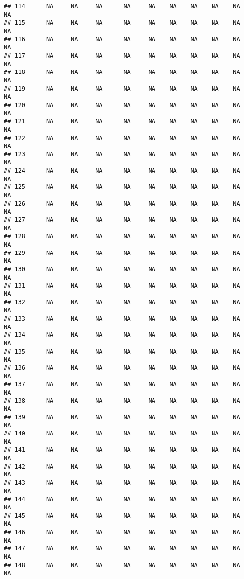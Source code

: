 \documentclass{article}\usepackage{graphicx, color}
\makeatletter
\newenvironment{kframe}{%
 \def\at@end@of@kframe{}%
 \ifinner\ifhmode%
  \def\at@end@of@kframe{\end{minipage}}%
  \begin{minipage}{\columnwidth}%
 \fi\fi%
 \def\FrameCommand##1{\hskip\@totalleftmargin \hskip-\fboxsep
 \colorbox{shadecolor}{##1}\hskip-\fboxsep
     \hskip-\linewidth \hskip-\@totalleftmargin \hskip\columnwidth}%
 \MakeFramed {\advance\hsize-\width
   \@totalleftmargin\z@ \linewidth\hsize
   \@setminipage}}%
 {\par\unskip\endMakeFramed%
 \at@end@of@kframe}
\newenvironment{knitrout}{}{} %
\makeatother
\begin{document}
\begin{knitrout}
\begin{kframe}
\begin{verbatim}
## 114      NA     NA     NA      NA     NA    NA    NA    NA    NA     NA
## 115      NA     NA     NA      NA     NA    NA    NA    NA    NA     NA
## 116      NA     NA     NA      NA     NA    NA    NA    NA    NA     NA
## 117      NA     NA     NA      NA     NA    NA    NA    NA    NA     NA
## 118      NA     NA     NA      NA     NA    NA    NA    NA    NA     NA
## 119      NA     NA     NA      NA     NA    NA    NA    NA    NA     NA
## 120      NA     NA     NA      NA     NA    NA    NA    NA    NA     NA
## 121      NA     NA     NA      NA     NA    NA    NA    NA    NA     NA
## 122      NA     NA     NA      NA     NA    NA    NA    NA    NA     NA
## 123      NA     NA     NA      NA     NA    NA    NA    NA    NA     NA
## 124      NA     NA     NA      NA     NA    NA    NA    NA    NA     NA
## 125      NA     NA     NA      NA     NA    NA    NA    NA    NA     NA
## 126      NA     NA     NA      NA     NA    NA    NA    NA    NA     NA
## 127      NA     NA     NA      NA     NA    NA    NA    NA    NA     NA
## 128      NA     NA     NA      NA     NA    NA    NA    NA    NA     NA
## 129      NA     NA     NA      NA     NA    NA    NA    NA    NA     NA
## 130      NA     NA     NA      NA     NA    NA    NA    NA    NA     NA
## 131      NA     NA     NA      NA     NA    NA    NA    NA    NA     NA
## 132      NA     NA     NA      NA     NA    NA    NA    NA    NA     NA
## 133      NA     NA     NA      NA     NA    NA    NA    NA    NA     NA
## 134      NA     NA     NA      NA     NA    NA    NA    NA    NA     NA
## 135      NA     NA     NA      NA     NA    NA    NA    NA    NA     NA
## 136      NA     NA     NA      NA     NA    NA    NA    NA    NA     NA
## 137      NA     NA     NA      NA     NA    NA    NA    NA    NA     NA
## 138      NA     NA     NA      NA     NA    NA    NA    NA    NA     NA
## 139      NA     NA     NA      NA     NA    NA    NA    NA    NA     NA
## 140      NA     NA     NA      NA     NA    NA    NA    NA    NA     NA
## 141      NA     NA     NA      NA     NA    NA    NA    NA    NA     NA
## 142      NA     NA     NA      NA     NA    NA    NA    NA    NA     NA
## 143      NA     NA     NA      NA     NA    NA    NA    NA    NA     NA
## 144      NA     NA     NA      NA     NA    NA    NA    NA    NA     NA
## 145      NA     NA     NA      NA     NA    NA    NA    NA    NA     NA
## 146      NA     NA     NA      NA     NA    NA    NA    NA    NA     NA
## 147      NA     NA     NA      NA     NA    NA    NA    NA    NA     NA
## 148      NA     NA     NA      NA     NA    NA    NA    NA    NA     NA

\end{verbatim}
\end{kframe}
\end{knitrout}
\end{document}
